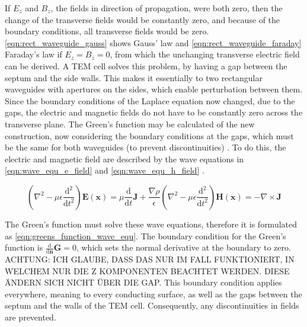 If $E_z$ and $B_z$, the fields in direction of propagation, were both zero, then the change of the transverse fields would be constantly zero, and because of the boundary conditions, all transverse fields would be zero. \autoref{eqn:rect_waveguide_gauss} shows Gauss' law and \autoref{eqn:rect_waveguide_faraday} Faraday's law if $E_z=B_z=0$, from which the unchanging transverse electric field can be derived. A TEM cell solves this problem, by having a gap between the septum and the side walls. This makes it essentially to two rectangular waveguides with apertures on the sides, which enable perturbation between them. Since the boundary conditions of the Laplace equation now changed, due to the gaps, the electric and magnetic fields do not have to be constantly zero across the transverse plane. The Green's function may be calculated of the new construction, now considering the boundary conditions at the gaps, which must be the same for both waveguides (to prevent discontinuities) \cite{Tippet_Chang_Crawford_1976,Wilson_1981}. To do this, the electric and magnetic field are described by the wave equations in \autoref{eqn:wave_equ_e_field} and \autoref{eqn:wave_equ_h_field} \cite{Collin_2015}. 

\begin{subequations}
\begin{equation}
    \left(\nabla^2-\mu\epsilon\frac{\mathrm{d^2}}{\mathrm{d}t^2}\right)\mathbf{E}(\mathbf{x})=\mu\frac{\mathrm{d}}{\mathrm{d}t}\mathbf{J}+\frac{\nabla\rho}{\epsilon}
    \label{eqn:wave_equ_e_field}
\end{equation}

\begin{equation}
    \left(\nabla^2-\mu\epsilon\frac{\mathrm{d^2}}{\mathrm{d}t^2}\right)\mathbf{H}(\mathbf{x})=-\nabla\times\mathbf{J}
    \label{eqn:wave_equ_h_field}
\end{equation}
\end{subequations}

The Green's function must solve these wave equations, therefore it is formulated as \autoref{eqn:greens_function_wave_equ}. The boundary condition for the Green's function is $\frac{\mathrm{d}}{\mathrm{d}\mathbf{n}}\mathbf{G}=0$, which sets the normal derivative at the boundary to zero. ACHTUNG: ICH GLAUBE, DASS DAS NUR IM FALL \cite{Wilson_1981} FUNKTIONIERT, IN WELCHEM NUR DIE Z KOMPONENTEN BEACHTET WERDEN. DIESE ÄNDERN SICH NICHT ÜBER DIE GAP. This boundary condition applies everywhere, meaning to every conducting surface, as well as the gaps between the septum and the walls of the TEM cell. Consequently, any discontinuities in fields are prevented.

